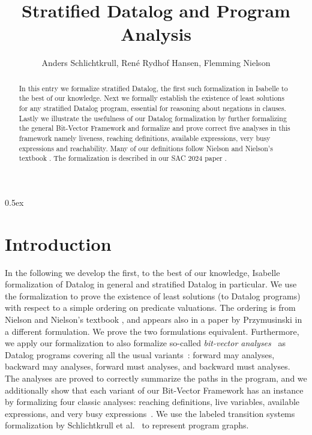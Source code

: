 \documentclass[10pt,a4paper]{article}
\begin{document}
\title{Stratified Datalog and Program Analysis}
\author{Anders Schlichtkrull, René Rydhof Hansen, Flemming Nielson}
\date{}

\maketitle

\begin{abstract}
\noindent
In this entry we formalize
stratified Datalog, the first such formalization in Isabelle to the best
of our knowledge. Next we formally establish the existence of least
solutions for any stratified Datalog program, essential for reasoning
about negations in clauses. Lastly we illustrate the usefulness of our
Datalog formalization by further formalizing the general Bit-Vector
Framework and formalize and prove correct five analyses in
this framework namely liveness, reaching definitions, available expressions,
very busy expressions and reachability.
Many of our definitions follow Nielson and
Nielson's textbook \cite{DBLP:journals/corr/abs-2012-10086}. 
The formalization is described in our SAC 2024 paper \cite{DBLP:conf/sac/SchlichtkrullHN24}.


\end{abstract}

\tableofcontents

\newpage

\parindent 0pt
\parskip 0.5ex

\section{Introduction}

In the following we develop the first, to the best of our knowledge,
Isabelle formalization of Datalog in general and stratified Datalog in
particular. We use the formalization to prove the existence of least
solutions (to Datalog programs) with respect to a simple ordering on
predicate valuations. 
The ordering is from Nielson and Nielson's textbook
\cite{NielsonNH:springer1999:PPA}, and appears also
in a paper by Przymusinski \cite{DBLP:books/mk/minker88/Przymusinski88} in a different formulation.
We prove the two formulations equivalent.
Furthermore, we apply our formalization to also
formalize so-called \emph{bit-vector
  analyses}~\cite{NielsonNH:springer1999:PPA} as Datalog programs
covering all the usual
variants~\cite{DBLP:journals/corr/abs-2012-10086}: forward may
analyses, backward may analyses, forward must analyses, and backward
must analyses. The analyses are proved to correctly summarize the
paths in the program, and we additionally show that each variant of
our Bit-Vector Framework has an instance by formalizing four classic
analyses: reaching definitions, live variables, available expressions,
and very busy expressions~\cite{NielsonNH:springer1999:PPA}.
We use the labeled transition systems formalization
by Schlichtkrull et al.~\cite{Labeled_Transition_Systems-AFP,DBLP:conf/fmcad/SchlichtkrullSST22} to represent program graphs.
\end{document}
